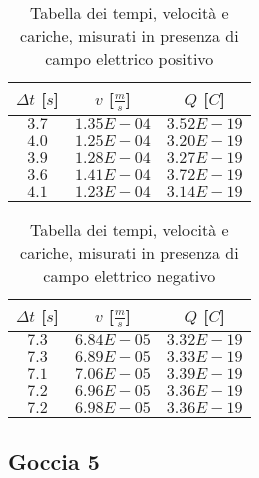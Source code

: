 \documentclass{article}
\begin{document}
\begin{multicols}{2}

\begin{table}[H]
	\centering
	\begin{tabular}{| c | c | c |}
		\hline
		$\Delta t$ [$s$] & $v$ [$\frac ms$] & $Q$ [$C$] \\
		\hline
		$3.7$ & $1.35E-04$ & $3.52E-19$ \\
		$4.0$ & $1.25E-04$ & $3.20E-19$ \\
		$3.9$ & $1.28E-04$ & $3.27E-19$ \\
		$3.6$ & $1.41E-04$ & $3.72E-19$ \\
		$4.1$ & $1.23E-04$ & $3.14E-19$ \\
		\hline
	\end{tabular}
	\caption{Tabella dei tempi, velocità e cariche, misurati in presenza di campo elettrico positivo}
	\label{}
\end{table}

\columnbreak

\begin{table}[H]
	\centering
	\begin{tabular}{| c | c | c |}
		\hline
		$\Delta t$ [$s$] & $v$ [$\frac ms$] & $Q$ [$C$] \\
		\hline
		$7.3$ & $6.84E-05$ & $3.32E-19$ \\
		$7.3$ & $6.89E-05$ & $3.33E-19$ \\
		$7.1$ & $7.06E-05$ & $3.39E-19$ \\
		$7.2$ & $6.96E-05$ & $3.36E-19$ \\
		$7.2$ & $6.98E-05$ & $3.36E-19$ \\
		\hline		
	\end{tabular}
	\caption{Tabella dei tempi, velocità e cariche, misurati in presenza di campo elettrico negativo}
	\label{}
\end{table}
	
\end{multicols}


\subsection{Goccia 5}
\end{document}
